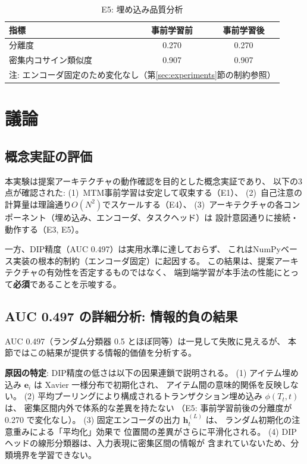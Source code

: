\documentclass[sigconf,nonacm]{acmart}
\begin{document}
\begin{table}[t]
\centering
\caption{E5: 埋め込み品質分析}
\label{tab:e5}
\begin{tabular}{lcc}
\toprule
指標 & 事前学習前 & 事前学習後 \\
\midrule
分離度 & 0.270 & 0.270 \\
密集内コサイン類似度 & 0.907 & 0.907 \\
\midrule
\multicolumn{3}{l}{\small 注: エンコーダ固定のため変化なし（第\ref{sec:experiments}節の制約参照）} \\
\bottomrule
\end{tabular}
\end{table}

\section{議論}
\label{sec:discussion}

\subsection{概念実証の評価}

本実験は提案アーキテクチャの動作確認を目的とした概念実証であり、
以下の3点が確認された:
(1)~MTM事前学習は安定して収束する（E1）、
(2)~自己注意の計算量は理論通り$O(N^2)$でスケールする（E4）、
(3)~アーキテクチャの各コンポーネント（埋め込み、エンコーダ、タスクヘッド）は
設計意図通りに接続・動作する（E3, E5）。

一方、DIP精度（AUC 0.497）は実用水準に達しておらず、
これはNumPyベース実装の根本的制約（エンコーダ固定）に起因する。
この結果は、提案アーキテクチャの有効性を否定するものではなく、
端到端学習が本手法の性能にとって\textbf{必須}であることを示唆する。

\subsection{AUC 0.497 の詳細分析: 情報的負の結果}

AUC 0.497（ランダム分類器 0.5 とほぼ同等）は一見して失敗に見えるが、
本節ではこの結果が提供する情報的価値を分析する。

\textbf{原因の特定}: DIP精度の低さは以下の因果連鎖で説明される。
(1) アイテム埋め込み $\mathbf{e}_i$ は Xavier 一様分布で初期化され、
アイテム間の意味的関係を反映しない。
(2) 平均プーリングにより構成されるトランザクション埋め込み $\phi(T_t, t)$ は、
密集区間内外で体系的な差異を持たない
（E5: 事前学習前後の分離度が 0.270 で変化なし）。
(3) 固定エンコーダの出力 $\mathbf{h}_t^{(L)}$ は、
ランダム初期化の注意重みによる「平均化」効果で
位置間の差異がさらに平滑化される。
(4) DIPヘッドの線形分類器は、入力表現に密集区間の情報が
含まれていないため、分類境界を学習できない。
\end{document}
